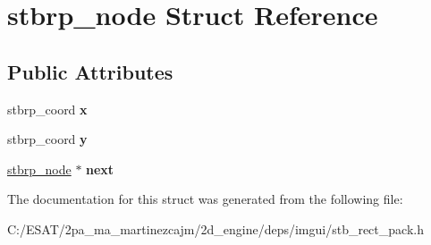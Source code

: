 \hypertarget{structstbrp__node}{}\section{stbrp\+\_\+node Struct Reference}
\label{structstbrp__node}
\subsection*{Public Attributes}
\begin{DoxyCompactItemize}
\item 
\mbox{\label{structstbrp__node_a45ab31a88025db27d08040d715b129ea}} 
stbrp\+\_\+coord {\bfseries x}
\item 
\mbox{\label{structstbrp__node_ad0415cb102a4f37aa45073653307e67e}} 
stbrp\+\_\+coord {\bfseries y}
\item 
\mbox{\label{structstbrp__node_a933cb2dd6cddc4fcaf10e3b40634bed4}} 
\hyperlink{structstbrp__node}{stbrp\+\_\+node} $\ast$ {\bfseries next}
\end{DoxyCompactItemize}


The documentation for this struct was generated from the following file\+:\begin{DoxyCompactItemize}
\item 
C\+:/\+E\+S\+A\+T/2pa\+\_\+ma\+\_\+martinezcajm/2d\+\_\+engine/deps/imgui/stb\+\_\+rect\+\_\+pack.\+h\end{DoxyCompactItemize}

